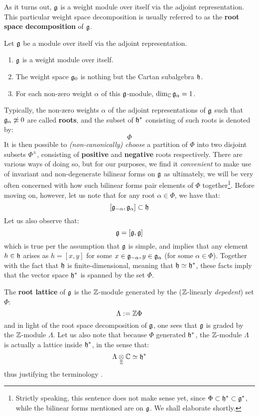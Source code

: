         As it turns out, $\mathfrak{g}$ is a weight module over itself via the adjoint representation. This particular weight space decomposition is usually referred to as the \textbf{root space decomposition} of $\mathfrak{g}$. 
        \begin{theorem} \label{theorem: root_space_decomposition_for_finite_dimensional_simple_lie_algebras}
            Let $\mathfrak{g}$ be a module over itself via the adjoint representation.
            \begin{enumerate}
                \item $\mathfrak{g}$ is a weight module over itself.
                \item The weight space $\mathfrak{g}_0$ is nothing but the Cartan subalgebra $\mathfrak{h}$.
                \item For each non-zero weight $\alpha$ of this $\mathfrak{g}$-module, $\dim_{\mathbb{C}} \mathfrak{g}_{\alpha} = 1$.
            \end{enumerate}
        \end{theorem}
        Typically, the non-zero weights $\alpha$ of the adjoint representations of $\mathfrak{g}$ such that $\mathfrak{g}_{\alpha} \not \simeq 0$ are called \textbf{roots}, and the subset of $\mathfrak{h}^*$ consisting of such roots is denoted by:
            $$\Phi$$
        It is then possible to \textit{(non-canonically) choose} a partition of $\Phi$ into two disjoint subsets $\Phi^{\pm}$, consisting of \textbf{positive} and \textbf{negative} roots respectively. There are various ways of doing so, but for our purposes, we find it \textit{convenient} to make use of invariant and non-degenerate bilinear forms on $\mathfrak{g}$ as ultimately, we will be very often concerned with how such bilinear forms pair elements of $\Phi$ together\footnote{Strictly speaking, this sentence does not make sense yet, since $\Phi \subset \mathfrak{h}^* \subset \mathfrak{g}^*$, while the bilinear forms mentioned are on $\mathfrak{g}$. We shall elaborate shortly.}. Before moving on, however, let us note that for any root $\alpha \in \Phi$, we have that:
            $$[\mathfrak{g}_{-\alpha}, \mathfrak{g}_{\alpha}] \subset \mathfrak{h}$$
        Let us also observe that:
            $$\mathfrak{g} = [\mathfrak{g}, \mathfrak{g}]$$
        which is true per the assumption that $\mathfrak{g}$ is simple, and implies that any element $h \in \mathfrak{h}$ arises as $h = [x, y]$ for some $x \in \mathfrak{g}_{-\alpha}, y \in \mathfrak{g}_{\alpha}$ (for some $\alpha \in \Phi$). Together with the fact that $\mathfrak{h}$ is finite-dimensional, meaning that $\mathfrak{h} \simeq \mathfrak{h}^*$, these facts imply that the vector space $\mathfrak{h}^*$ is spanned by the set $\Phi$.

        The \textbf{root lattice} of $\mathfrak{g}$ is the $\mathbb{Z}$-module generated by the ($\mathbb{Z}$-linearly \textit{depedent}) set $\Phi$:
            $$\Lambda := \mathbb{Z} \Phi$$
        and in light of the root space decomposition of $\mathfrak{g}$, one sees that $\mathfrak{g}$ is graded by the $\mathbb{Z}$-module $\Lambda$. Let us also note that because $\Phi$ generated $\mathfrak{h}^*$, the $\mathbb{Z}$-module $\Lambda$ is actually a lattice inside $\mathfrak{h}^*$, in the sense that:
            $$\Lambda \tensor_{\Z} \bbC \cong \h^*$$
        thus justifying the terminology .

